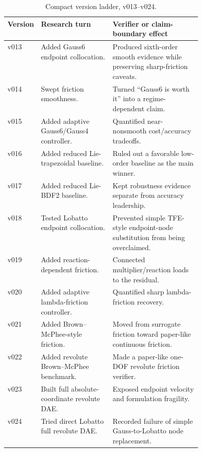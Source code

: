 \documentclass[10pt]{article}
\begin{document}
\begin{table}[H]
\centering
\caption{Compact version ladder, v013--v024.}
\label{tab:version_ladder_b}
\scriptsize
\begin{tabularx}{\linewidth}{p{0.08\linewidth}p{0.37\linewidth}Y}
\toprule
\textbf{Version} & \textbf{Research turn} & \textbf{Verifier or claim-boundary effect} \\
\midrule
v013 & Added Gauss6 endpoint collocation. & Produced sixth-order smooth evidence while preserving sharp-friction caveats. \\
v014 & Swept friction smoothness. & Turned ``Gauss6 is worth it'' into a regime-dependent claim. \\
v015 & Added adaptive Gauss6/Gauss4 controller. & Quantified near-nonsmooth cost/accuracy tradeoffs. \\
v016 & Added reduced Lie-trapezoidal baseline. & Ruled out a favorable low-order baseline as the main winner. \\
v017 & Added reduced Lie-BDF2 baseline. & Kept robustness evidence separate from accuracy leadership. \\
v018 & Tested Lobatto endpoint collocation. & Prevented simple TFE-style endpoint-node substitution from being overclaimed. \\
v019 & Added reaction-dependent friction. & Connected multiplier/reaction loads to the residual. \\
v020 & Added adaptive lambda-friction controller. & Quantified sharp lambda-friction recovery. \\
v021 & Added Brown--McPhee-style friction. & Moved from surrogate friction toward paper-like continuous friction. \\
v022 & Added revolute Brown--McPhee benchmark. & Made a paper-like one-DOF revolute friction verifier. \\
v023 & Built full absolute-coordinate revolute DAE. & Exposed endpoint velocity and formulation fragility. \\
v024 & Tried direct Lobatto full revolute DAE. & Recorded failure of simple Gauss-to-Lobatto node replacement. \\
\bottomrule
\end{tabularx}
\end{table}
\end{document}

